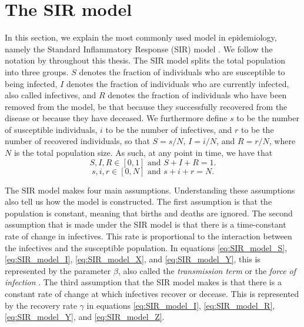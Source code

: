 \documentclass[12pt]{article}
\begin{document}
	\section{The SIR model}\label{sec:sir_model}
	In this section, we explain the most commonly used model in epidemiology, namely the Standard Inflammatory Response (SIR) model \parencite{kermack1927contribution, anderson1992infectious}. We follow the notation by \textcite{keeling2011modeling} throughout this thesis. The SIR model splits the total population into three groups. $S$ denotes the fraction of individuals who are susceptible to being infected, $I$ denotes the fraction of individuals who are currently infected, also called infectives, and $R$ denotes the fraction of individuals who have been removed from the model, be that because they successfully recovered from the disease or because they have deceased. We furthermore define $s$ to be the number of susceptible individuals, $i$ to be the number of infectives, and $r$ to be the number of recovered individuals, so that $S = s/N$, $I = i/N$, and $R = r/N$, where $N$ is the total population size. As such, at any point in time, we have that
	\[S,I,R \in [0,1] \text{ and } S+I+R=1.\]
	\[s,i,r \in [0,N] \text{ and } s+i+r=N.\]
	
	The SIR model makes four main assumptions. Understanding these assumptions also tell us how the model is constructed. The first assumption is that the population is constant, meaning that births and deaths are ignored. The second assumption that is made under the SIR model is that there is a time-constant rate of change in infectives. This rate is proportional to the interaction between the infectives and the susceptible population. In equations \eqref{eq:SIR_model_S}, \eqref{eq:SIR_model_I}, \eqref{eq:SIR_model_X}, and \eqref{eq:SIR_model_Y}, this is represented by the parameter $\beta$, also called the \textit{transmission term} or the \textit{force of infection} \parencite{keeling2011modeling}.
	The third assumption that the SIR model makes is that there is a constant rate of change at which infectives recover or decease. This is represented by the recovery rate $\gamma$ in equations \eqref{eq:SIR_model_I}, \eqref{eq:SIR_model_R}, \eqref{eq:SIR_model_Y}, and \eqref{eq:SIR_model_Z}.  \\
	
\end{document}
